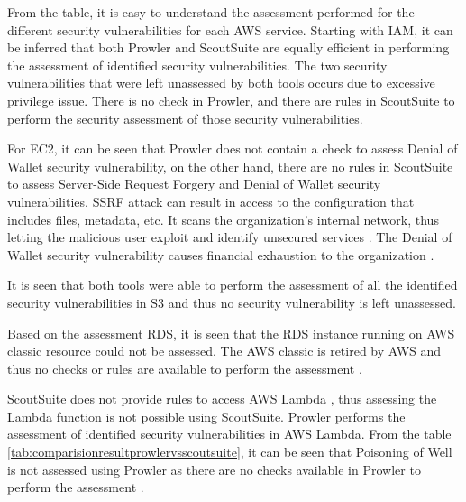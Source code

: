 \par From the table, it is easy to understand the assessment performed for the different security vulnerabilities for each AWS service.
Starting with IAM, it can be inferred that both Prowler and ScoutSuite are equally efficient in performing the assessment of identified security vulnerabilities.
The two security vulnerabilities that were left unassessed by both tools occurs due to excessive privilege issue.
There is no check in Prowler, and there are rules in ScoutSuite to perform the security assessment of those security vulnerabilities.

\par For EC2, it can be seen that Prowler does not contain a check to assess Denial of Wallet security vulnerability, on the other hand, there are no rules in ScoutSuite to assess Server-Side Request Forgery and Denial of Wallet security vulnerabilities. SSRF attack can result in access to the configuration that includes files, metadata, etc. It scans the organization’s internal network, thus letting the malicious user exploit and identify unsecured services \cite{97}. The Denial of Wallet security vulnerability causes financial exhaustion to the organization \cite{86}.

\par It is seen that both tools were able to perform the assessment of all the identified security vulnerabilities in S3 and thus no security vulnerability is left unassessed.

\par Based on the assessment RDS, it is seen that the RDS instance running on AWS classic resource could not be assessed.
The AWS classic is retired by AWS and thus no checks or rules are available to perform the assessment \cite{88}.


\par ScoutSuite does not provide rules to access AWS Lambda \cite{72}, thus assessing the Lambda function is not possible using ScoutSuite.
Prowler performs the assessment of identified security vulnerabilities in AWS Lambda.
From the table \ref{tab:comparisionresultprowlervsscoutsuite}, it can be seen that Poisoning of Well is not assessed using Prowler as there are no checks available in Prowler to perform the assessment \cite{90}.